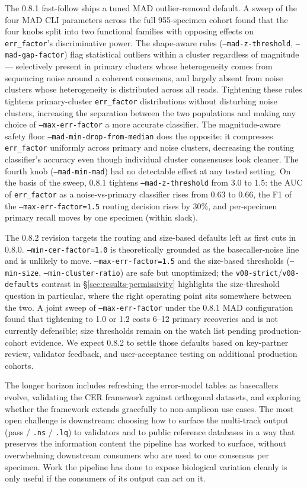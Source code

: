 \documentclass[11pt]{article}
\begin{document}
The 0.8.1 fast-follow ships a tuned MAD outlier-removal default. A
sweep of the four MAD CLI parameters across the full 955-specimen
cohort found that the four knobs split into two functional families
with opposing effects on \texttt{err\_factor}'s discriminative power.
The shape-aware rules (\texttt{--mad-z-threshold},
\texttt{--mad-gap-factor}) flag statistical outliers within a cluster
regardless of magnitude --- selectively present in primary clusters
whose heterogeneity comes from sequencing noise around a coherent
consensus, and largely absent from noise clusters whose heterogeneity
is distributed across all reads. Tightening these rules tightens
primary-cluster \texttt{err\_factor} distributions without disturbing
noise clusters, increasing the separation between the two populations
and making any choice of \texttt{--max-err-factor} a more accurate
classifier. The magnitude-aware safety floor
\texttt{--mad-min-drop-from-median} does the opposite: it compresses
\texttt{err\_factor} uniformly across primary and noise clusters,
decreasing the routing classifier's accuracy even though individual
cluster consensuses look cleaner. The fourth knob
(\texttt{--mad-min-mad}) had no detectable effect at any tested
setting. On the basis of the sweep, 0.8.1 tightens
\texttt{--mad-z-threshold} from 3.0 to 1.5: the AUC of
\texttt{err\_factor} as a noise-vs-primary classifier rises from 0.63
to 0.66, the F1 of the \texttt{--max-err-factor=1.5} routing decision
rises by 30\%, and per-specimen primary recall moves by one specimen
(within slack).

The 0.8.2 revision targets the routing and size-based defaults left
as first cuts in 0.8.0. \texttt{--min-cer-factor=1.0} is theoretically
grounded as the basecaller-noise line and is unlikely to move.
\texttt{--max-err-factor=1.5} and the size-based thresholds
(\texttt{--min-size}, \texttt{--min-cluster-ratio}) are safe but
unoptimized; the \texttt{v08-strict}/\texttt{v08-defaults} contrast in
§\ref{sec:results-permissivity} highlights the size-threshold
question in particular, where the right operating point sits
somewhere between the two. A joint sweep of \texttt{--max-err-factor}
under the 0.8.1 MAD configuration found that tightening to 1.0 or 1.2
costs 6--12 primary recoveries and is not currently defensible; size
thresholds remain on the watch list pending production-cohort
evidence. We expect 0.8.2 to settle those defaults based on
key-partner review, validator feedback, and user-acceptance testing
on additional production cohorts.

The longer horizon includes refreshing the error-model tables as
basecallers evolve, validating the CER framework against orthogonal
datasets, and exploring whether the framework extends gracefully to
non-amplicon use cases. The most open challenge is downstream:
choosing how to surface the multi-track output (pass / \texttt{.ns} /
\texttt{.lq}) to validators and to public reference databases in a way
that preserves the information content the pipeline has worked to
surface, without overwhelming downstream consumers who are used to one
consensus per specimen. Work the pipeline has done to expose
biological variation cleanly is only useful if the consumers of its
output can act on it.
\end{document}
